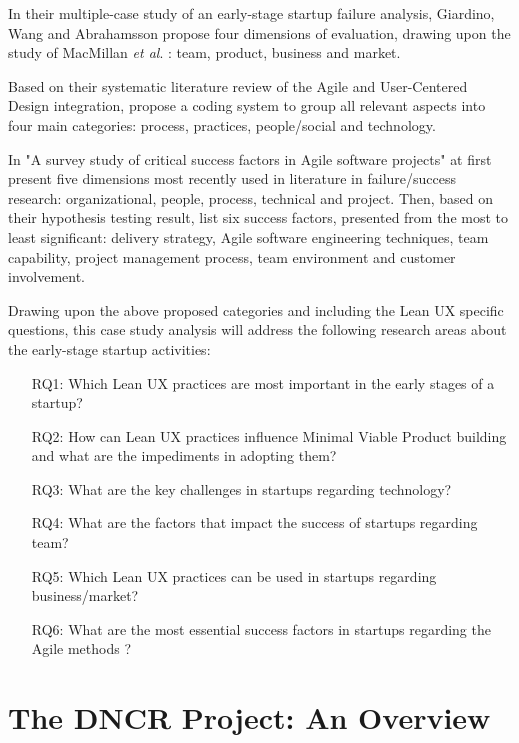 \documentclass{article}
\begin{document}
In their multiple-case study of an early-stage startup failure analysis, Giardino, Wang and Abrahamsson \citep{giardino2014early} propose four dimensions of evaluation, drawing upon the study of MacMillan \textit{et al}. \citep{macmillan1987criteria}: team, product, business and market.

Based on their systematic literature review of the Agile and User-Centered Design integration,  \cite{brhel2015exploring} propose a coding system to group all relevant aspects into four main categories: process, practices, people/social and technology.

In "A survey study of critical success factors in Agile software projects" \cite{cao2008agile} at first present five dimensions most recently used in literature in failure/success research: organizational, people, process, technical and project. Then, based on their hypothesis testing result, \citeauthor{cao2008agile} list six success factors, presented from the most to least significant: delivery strategy, Agile software engineering techniques, team capability, project management process, team environment and customer involvement.

Drawing upon the above proposed categories and including the Lean UX specific questions, this case study analysis will address the following research areas about the early-stage startup activities:

\begin{itemize}
\item[RQ1:] Which Lean UX practices are most important in the early stages of a startup?
\item[RQ2:] How can Lean UX practices influence Minimal Viable Product building and what are the impediments in adopting them?
\item[RQ3:] What are the key challenges in startups regarding technology?
\item[RQ4:] What are the factors that impact the success of startups regarding team?
\item[RQ5:] Which Lean UX practices can be used in startups regarding business/market?
\item[RQ6:] What are the most essential success factors in startups regarding the Agile methods \citep{cao2008agile}?

\end{itemize}

\section{The DNCR Project: An Overview}
\label{sec:dncr-project}
\end{document}
